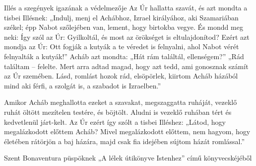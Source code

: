 \documentclass[twoside]{article}
\begin{document}
\begin{lectio}{Illés a szegények igazának a védelmezője}
Az Úr hallatta szavát, és azt mondta a tisbei Illésnek: „Indulj, menj el Achábhoz, Izrael királyához, aki Szamariában székel; épp Nabot szőlejében van, lement, hogy birtokba vegye. És mondd meg neki: Így szól az Úr: Gyilkoltál, és most az örökséget is eltulajdonítod? Ezért azt mondja az Úr: Ott fogják a kutyák a te véredet is felnyalni, ahol Nabot vérét felnyalták a kutyák!” Acháb azt mondta: „Hát rám találtál, ellenségem?” „Rád találtam – felelte. Mert arra adtad magad, hogy azt tedd, ami gonosznak számít az Úr szemében. Lásd, romlást hozok rád, elsöpörlek, kiirtom Acháb házából mind aki férfi, a szolgát is, a szabadot is Izraelben.”

Amikor Acháb meghallotta ezeket a szavakat, megszaggatta ruháját, vezeklő ruhát öltött mezítelen testére, és böjtölt. Aludni is vezeklő ruhában tért és kedvetlenül járt-kelt. Az Úr ezért így szólt a tisbei Illéshez: „Látod, hogy megalázkodott előttem Acháb? Mivel megalázkodott előttem, nem hagyom, hogy életében rátörjön a baj házára, majd csak fia idejében sújtom házát romlással.”
\end{lectio}



Szent Bonaventura püspöknek „A lélek útikönyve Istenhez” című könyvecskéjéből

{\centering{}}
\end{document}
